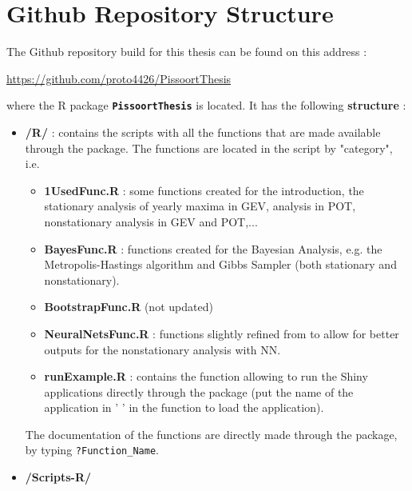 \chapter{Github Repository Structure}\label{appgit}

The Github repository build for this thesis can be found on this address :

\begin{center}
\url{https://github.com/proto4426/PissoortThesis}
\end{center}

where the R package \textbf{\texttt{PissoortThesis}} is located. It has the following \textbf{structure} : 

\begin{itemize}
\item \textbf{/R/} : contains the scripts with all the functions that are made available through the package. The functions are located in the script by "category", i.e. 
\begin{itemize}
\item \textbf{1UsedFunc.R} : some functions created for the introduction, the stationary analysis of yearly maxima in GEV, analysis in POT, nonstationary analysis in GEV and POT,...
\item \textbf{BayesFunc.R} : functions created for the Bayesian Analysis, e.g. the Metropolis-Hastings algorithm and Gibbs Sampler (both stationary and nonstationary).
\item \textbf{BootstrapFunc.R} (not updated)
\item \textbf{NeuralNetsFunc.R} : functions slightly refined from \citet{cannon_flexible_2010} to allow for better outputs for the nonstationary analysis with NN.
\item \textbf{runExample.R} : contains the function allowing to run the Shiny applications directly through the package (put the name of the application in ' ' in the function to load the application). 
\end{itemize} 

The documentation of the functions are directly made through the package, by typing \texttt{?Function\_Name}.
\item \textbf{/Scripts-R/}


\end{itemize}
